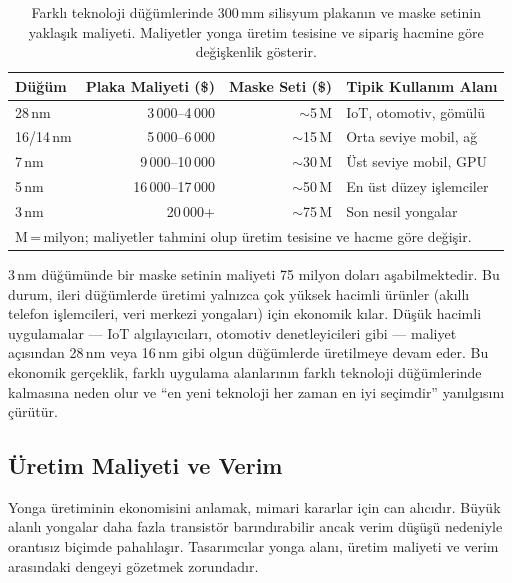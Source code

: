 \begin{table}[ht!]
\centering
\caption[Teknoloji düğümlerine göre üretim maliyetleri]{Farklı teknoloji düğümlerinde 300\,mm silisyum plakanın ve maske setinin yaklaşık maliyeti. Maliyetler yonga üretim tesisine ve sipariş hacmine göre değişkenlik gösterir.}
\label{tab:plaka-maliyetleri}
\footnotesize
\begin{tabular}{lrrl}
\toprule
\textbf{Düğüm} & \textbf{Plaka Maliyeti (\$)} & \textbf{Maske Seti (\$)} & \textbf{Tipik Kullanım Alanı} \\
\midrule
28\,nm    & 3\,000--4\,000     & ${\sim}$5\,M    & IoT, otomotiv, gömülü \\
16/14\,nm & 5\,000--6\,000     & ${\sim}$15\,M   & Orta seviye mobil, ağ \\
7\,nm     & 9\,000--10\,000    & ${\sim}$30\,M   & Üst seviye mobil, GPU \\
5\,nm     & 16\,000--17\,000   & ${\sim}$50\,M   & En üst düzey işlemciler \\
3\,nm     & 20\,000+           & ${\sim}$75\,M   & Son nesil yongalar \\
\bottomrule
\multicolumn{4}{l}{\scriptsize M\,=\,milyon; maliyetler tahmini olup üretim tesisine ve hacme göre değişir.}
\end{tabular}
\end{table}

3\,nm düğümünde bir maske setinin maliyeti 75 milyon doları aşabilmektedir. Bu durum, ileri düğümlerde üretimi yalnızca çok yüksek hacimli ürünler (akıllı telefon işlemcileri, veri merkezi yongaları) için ekonomik kılar. Düşük hacimli uygulamalar --- IoT algılayıcıları, otomotiv denetleyicileri gibi --- maliyet açısından 28\,nm veya 16\,nm gibi olgun düğümlerde üretilmeye devam eder. Bu ekonomik gerçeklik, farklı uygulama alanlarının farklı teknoloji düğümlerinde kalmasına neden olur ve ``en yeni teknoloji her zaman en iyi seçimdir'' yanılgısını çürütür.


\subsection{Üretim Maliyeti ve Verim}
\label{sec:maliyet-verim}

Yonga üretiminin ekonomisini anlamak, mimari kararlar için can alıcıdır. Büyük alanlı yongalar daha fazla transistör barındırabilir ancak verim düşüşü nedeniyle orantısız biçimde pahalılaşır. Tasarımcılar yonga alanı, üretim maliyeti ve verim arasındaki dengeyi gözetmek zorundadır.

